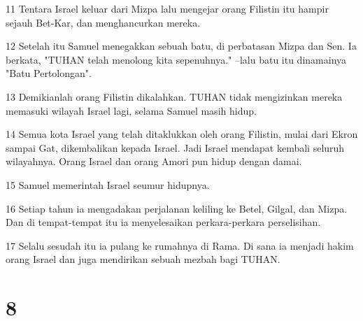 \par 11 Tentara Israel keluar dari Mizpa lalu mengejar orang Filistin itu hampir sejauh Bet-Kar, dan menghancurkan mereka.
\par 12 Setelah itu Samuel menegakkan sebuah batu, di perbatasan Mizpa dan Sen. Ia berkata, "TUHAN telah menolong kita sepenuhnya." --lalu batu itu dinamainya "Batu Pertolongan".
\par 13 Demikianlah orang Filistin dikalahkan. TUHAN tidak mengizinkan mereka memasuki wilayah Israel lagi, selama Samuel masih hidup.
\par 14 Semua kota Israel yang telah ditaklukkan oleh orang Filistin, mulai dari Ekron sampai Gat, dikembalikan kepada Israel. Jadi Israel mendapat kembali seluruh wilayahnya. Orang Israel dan orang Amori pun hidup dengan damai.
\par 15 Samuel memerintah Israel seumur hidupnya.
\par 16 Setiap tahun ia mengadakan perjalanan keliling ke Betel, Gilgal, dan Mizpa. Dan di tempat-tempat itu ia menyelesaikan perkara-perkara perselisihan.
\par 17 Selalu sesudah itu ia pulang ke rumahnya di Rama. Di sana ia menjadi hakim orang Israel dan juga mendirikan sebuah mezbah bagi TUHAN.

\chapter{8}

